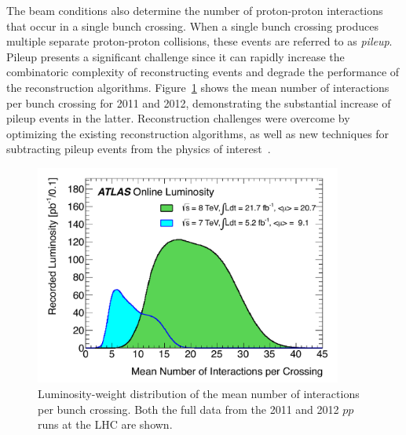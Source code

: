 The beam conditions also determine the number of proton-proton interactions that occur in a single bunch crossing. When a single bunch crossing produces multiple separate proton-proton collisions, these events are referred to as \textit{pileup}. Pileup presents a significant challenge since it can rapidly increase the combinatoric complexity of reconstructing events and degrade the performance of the reconstruction algorithms. Figure~\ref{fig:atlas-pileup} shows the mean number of interactions per bunch crossing for 2011 and 2012, demonstrating the substantial increase of pileup events in the latter. Reconstruction challenges were overcome by optimizing the existing reconstruction algorithms, as well as new techniques for subtracting pileup events from the physics of interest~\cite{pileup}. 

\begin{figure}[tp]
  \centering
  \includegraphics[width=0.90\textwidth]{fig/atlas/pileup.pdf}
  \caption{Luminosity-weight distribution of the mean number of interactions per bunch crossing. Both the full data from the 2011 and 2012 $pp$ runs at the LHC are shown.}
  \label{fig:atlas-pileup}
\end{figure}



